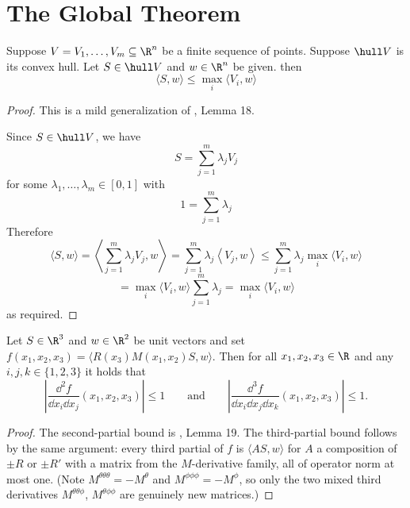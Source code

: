 \chapter{The Global Theorem}

\begin{lemma} \label{lem:hullscalarprod}
\leanok
{}
Suppose $V = V_1, \ldots, V_m \subseteq \R^n$ be a finite sequence of points. Suppose $\hull V$ is its convex hull.
Let $S \in \hull V$ and $w \in \R^n$ be given. then
    \[
        \langle S ,w \rangle \leq \max_{i} \langle V_i ,w\rangle
    \]
\end{lemma}

\begin{proof}
\leanok
This is a mild generalization of \cite{polyhedron.without.rupert}, Lemma 18.

Since $S \in \hull V$, we have
\[ S = \sum_{j=1}^m \lambda_j V_j \]
for some $\lambda_1,\ldots,\lambda_m \in [0,1]$ with
\[ 1 = \sum_{j=1}^m \lambda_j  \]
Therefore
\[
\langle S ,w \rangle = \left\langle  \sum_{j=1}^m \lambda_j V_j ,w \right\rangle
=  \sum_{j=1}^m \lambda_j \left\langle   V_j ,w \right\rangle
\le   \sum_{j=1}^m \lambda_j \max_{i} \langle V_i ,w\rangle
\]
\[
=  \max_{i} \langle V_i ,w\rangle \sum_{j=1}^m \lambda_j
=  \max_{i} \langle V_i ,w\rangle
\]
as required.
\end{proof}


\begin{lemma} \label{lem:leq1}
\leanok
    Let $S \in \R^3$ and $w \in \R^2$ be unit vectors and set $f(x_1,x_2,x_3) = \langle R(x_3) M(x_1,x_2)S,w \rangle$. Then for all $x_1,x_2,x_3 \in \R$ and any $i,j,k \in \{1,2,3\}$ it holds that
    \[
        \left|\frac{\dd^2 f}{\dd x_i \dd x_j}(x_1,x_2,x_3)\right|\leq 1
        \qquad\text{and}\qquad
        \left|\frac{\dd^3 f}{\dd x_i \dd x_j \dd x_k}(x_1,x_2,x_3)\right|\leq 1.
    \]
\end{lemma}

\begin{proof}\leanok
The second-partial bound is \cite{polyhedron.without.rupert}, Lemma 19.  The
third-partial bound follows by the same argument: every third partial of $f$
is $\langle A S, w\rangle$ for $A$ a composition of $\pm R$ or $\pm R'$ with a
matrix from the $M$-derivative family, all of operator norm at most one.
(Note $M^{\theta\theta\theta} = -M^\theta$ and $M^{\phi\phi\phi} = -M^\phi$,
so only the two mixed third derivatives $M^{\theta\theta\phi}$,
$M^{\theta\phi\phi}$ are genuinely new matrices.)
\end{proof}

